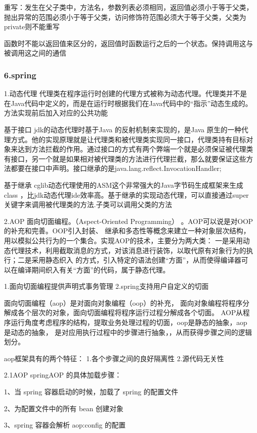 \documentclass[UTF8]{ctexart}
\begin{document}
重写：发生在父子类中，方法名，参数列表必须相同，返回值必须小于等于父类，抛出异常的范围必须小于等于父类，访问修饰符范围必须大于等于父类，父类为private则不能重写

函数时不能以返回值来区分的，返回值时函数运行之后的一个状态。保持调用这与被调用这之间的通信

\subsubsection{6.spring}
1.动态代理
代理类在程序运行时创建的代理方式被称为动态代理。代理类并不是在Java代码中定义的，而是在运行时根据我们在Java代码中的“指示”动态生成的。方法实现前后加入对应的公共功能

基于接口
jdk的动态代理时基于Java 的反射机制来实现的，是Java 原生的一种代理方式。他的实现原理就是让代理类和被代理类实现同一接口，代理类持有目标对象来达到方法拦截的作用。通过接口的方式有两个弊端一个就是必须保证被代理类有接口，另一个就是如果相对被代理类的方法进行代理拦截，那么就要保证这些方法都要在接口中声明。接口继承的是java.lang.reflect.InvocationHandler;

基于继承
cglib动态代理使用的ASM这个非常强大的Java字节码生成框架来生成class ，比jdk动态代理ide效率高。基于继承的实现动态代理，可以直接通过super关键字来调用被代理类的方法.子类可以调用父类的方法

2.AOP
面向切面编程。（Aspect-Oriented Programming） 。AOP可以说是对OOP的补充和完善。OOP引入封装、 继承和多态性等概念来建立一种对象层次结构，用以模拟公共行为的一个集合。实现AOP的技术，主要分为两大类： 一是采用动态代理技术，利用截取消息的方式，对该消息进行装饰，以取代原有对象行为的执行；二是采用静态织入 的方式，引入特定的语法创建“方面”，从而使得编译器可以在编译期间织入有关“方面”的代码，属于静态代理。

1.面向切面编程提供声明式事务管理
2.spring支持用户自定义的切面

面向切面编程（aop）是对面向对象编程（oop）的补充， 面向对象编程将程序分解成各个层次的对象，面向切面编程将程序运行过程分解成各个切面。 AOP从程序运行角度考虑程序的结构，提取业务处理过程的切面，oop是静态的抽象，aop是动态的抽象， 是对应用执行过程中的步骤进行抽象，，从而获得步骤之间的逻辑划分。

aop框架具有的两个特征：
1.各个步骤之间的良好隔离性
2.源代码无关性

2.1AOP
springAOP 的具体加载步骤：

1、当 spring 容器启动的时候，加载了 spring 的配置文件

2、为配置文件中的所有 bean 创建对象

3、spring 容器会解析 aop:config 的配置
\end{document}
